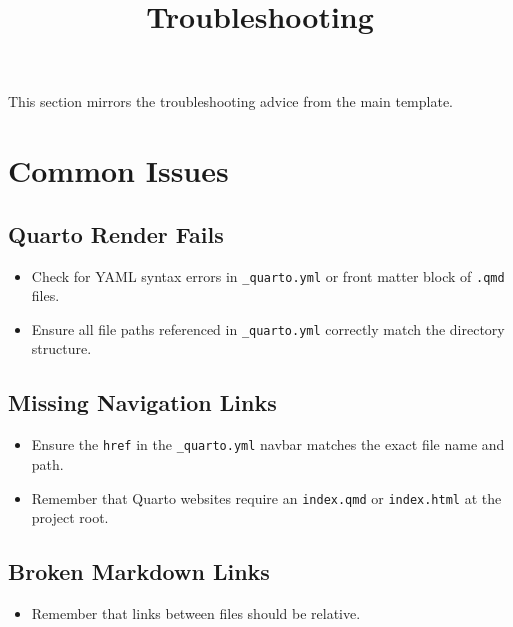 \documentclass[
]{report}
\title{Troubleshooting}
\author{}
\date{}
\providecommand{\tightlist}{%
  \setlength{\itemsep}{0pt}\setlength{\parskip}{0pt}}
\renewcommand*\contentsname{Table of contents}
\newcommand\contentsname{Table of contents}
\begin{document}
\maketitle

\renewcommand*\contentsname{Table of contents}
{
\hypersetup{linkcolor=}
\setcounter{tocdepth}{2}
\tableofcontents
}

This section mirrors the troubleshooting advice from the main template.

\chapter{Common Issues}\label{common-issues}

\section{Quarto Render Fails}\label{quarto-render-fails}

\begin{itemize}
\tightlist
\item
  Check for YAML syntax errors in \texttt{\_quarto.yml} or front matter
  block of \texttt{.qmd} files.
\item
  Ensure all file paths referenced in \texttt{\_quarto.yml} correctly
  match the directory structure.
\end{itemize}

\section{Missing Navigation Links}\label{missing-navigation-links}

\begin{itemize}
\tightlist
\item
  Ensure the \texttt{href} in the \texttt{\_quarto.yml} navbar matches
  the exact file name and path.
\item
  Remember that Quarto websites require an \texttt{index.qmd} or
  \texttt{index.html} at the project root.
\end{itemize}

\section{Broken Markdown Links}\label{broken-markdown-links}

\begin{itemize}
\tightlist
\item
  Remember that links between files should be relative.
\end{itemize}
\end{document}
